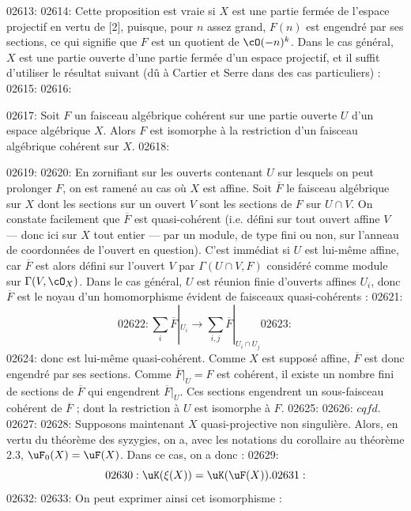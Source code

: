 02613: 
02614: Cette proposition est vraie si $X$ est une partie ferm\'ee de l'espace projectif en vertu de [2], puisque, pour $n$ assez grand, $F(n)$ est engendr\'e par ses sections, ce qui signifie que $F$ est un quotient de $\cO(-n)^k$. Dans le cas g\'en\'eral, $X$ est une partie ouverte d'une partie ferm\'ee d'un espace projectif, et il suffit d'utiliser le r\'esultat suivant (d\^u \`a Cartier et Serre dans des cas particuliers) :
02615: 
02616: \begin{proposition}\label{prop:2.5}
02617: Soit $F$ un faisceau alg\'ebrique coh\'erent sur une partie ouverte $U$ d'un espace alg\'ebrique $X$. Alors $F$ est isomorphe \`a la restriction d'un faisceau alg\'ebrique coh\'erent sur $X$.
02618: \end{proposition}
02619: 
02620: En zornifiant sur les ouverts contenant $U$ sur lesquels on peut prolonger $F$, on est ramen\'e au cas o\`u $X$ est affine. Soit $\overline{F}$ le faisceau alg\'ebrique sur $X$ dont les sections sur un ouvert $V$ sont les sections de $F$ sur $U \cap V$. On constate facilement que $\overline{F}$ est quasi-coh\'erent (i.e. d\'efini sur tout ouvert affine $V$ --- donc ici sur $X$ tout entier --- par un module, de type fini ou non, sur l'anneau de coordonn\'ees de l'ouvert en question). C'est imm\'ediat si $U$ est lui-m\^eme affine, car $\overline{F}$ est alors d\'efini sur l'ouvert $V$ par $\Gamma(U \cap V, F)$ consid\'er\'e comme module sur $\Gamma(V, \cO_X)$. Dans le cas g\'en\'eral, $U$ est r\'eunion finie d'ouverts affines $U_i$, donc $\overline{F}$ est le noyau d'un homomorphisme \'evident de faisceaux quasi-coh\'erents :
02621: \[
02622: \sum_i \overline{F}|_{U_i} \longrightarrow \sum_{i,j} \overline{F}|_{U_i \cap U_j}
02623: \]
02624: donc est lui-m\^eme quasi-coh\'erent. Comme $X$ est suppos\'e affine, $\overline{F}$ est donc engendr\'e par ses sections. Comme $\overline{F}|_U = F$ est coh\'erent, il existe un nombre fini de sections de $\overline{F}$ qui engendrent $\overline{F}|_U$. Ces sections engendrent un sous-faisceau coh\'erent de $\overline{F}$ ; dont la restriction \`a $U$ est isomorphe \`a $F$.
02625: 
02626: \hfill $cqfd.$
02627: 
02628: Supposons maintenant $X$ quasi-projective non singuli\`ere. Alors, en vertu du th\'eor\`eme des syzygies, on a, avec les notations du corollaire au th\'eor\`eme 2.3, $\uF_0(X) = \uF(X)$. Dans ce cas, on a donc :
02629: \begin{equation}\label{eq:2.13}
02630: \uK(\xi(X)) = \uK(\uF(X)).
02631: \end{equation}
02632: 
02633: On peut exprimer ainsi cet isomorphisme :
